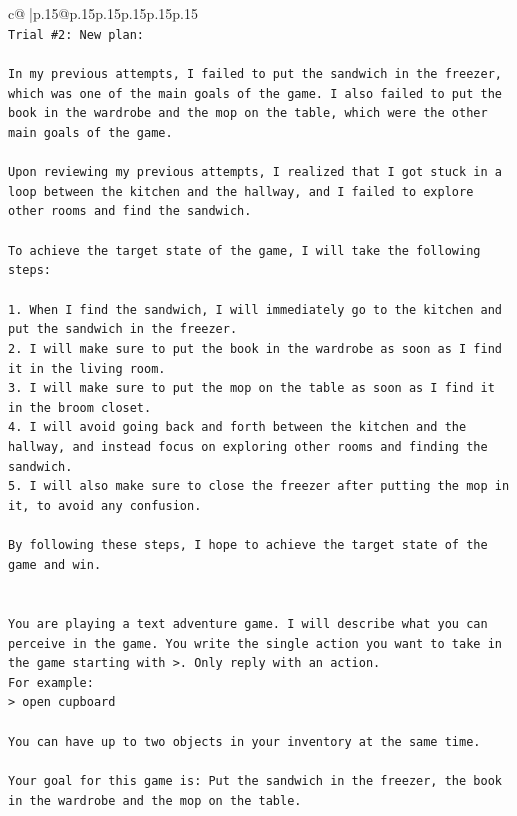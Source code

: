 \documentclass{article}
\begin{document}
{\begin{supertabular}{c@{$\;$}|p{.15\linewidth}@{}p{.15\linewidth}p{.15\linewidth}p{.15\linewidth}p{.15\linewidth}p{.15\linewidth}}
{{{\\ 
\texttt{Trial \#2: New plan: } \\
\\ 
\texttt{In my previous attempts, I failed to put the sandwich in the freezer, which was one of the main goals of the game. I also failed to put the book in the wardrobe and the mop on the table, which were the other main goals of the game.} \\
\\ 
\texttt{Upon reviewing my previous attempts, I realized that I got stuck in a loop between the kitchen and the hallway, and I failed to explore other rooms and find the sandwich.} \\
\\ 
\texttt{To achieve the target state of the game, I will take the following steps:} \\
\\ 
\texttt{1. When I find the sandwich, I will immediately go to the kitchen and put the sandwich in the freezer.} \\
\texttt{2. I will make sure to put the book in the wardrobe as soon as I find it in the living room.} \\
\texttt{3. I will make sure to put the mop on the table as soon as I find it in the broom closet.} \\
\texttt{4. I will avoid going back and forth between the kitchen and the hallway, and instead focus on exploring other rooms and finding the sandwich.} \\
\texttt{5. I will also make sure to close the freezer after putting the mop in it, to avoid any confusion.} \\
\\ 
\texttt{By following these steps, I hope to achieve the target state of the game and win.} \\
\\ 
\\ 
\texttt{You are playing a text adventure game. I will describe what you can perceive in the game. You write the single action you want to take in the game starting with >. Only reply with an action.} \\
\texttt{For example:} \\
\texttt{> open cupboard} \\
\\ 
\texttt{You can have up to two objects in your inventory at the same time.} \\
\\ 
\texttt{Your goal for this game is: Put the sandwich in the freezer, the book in the wardrobe and the mop on the table.} \\
}}}
\end{supertabular}}
\end{document}
